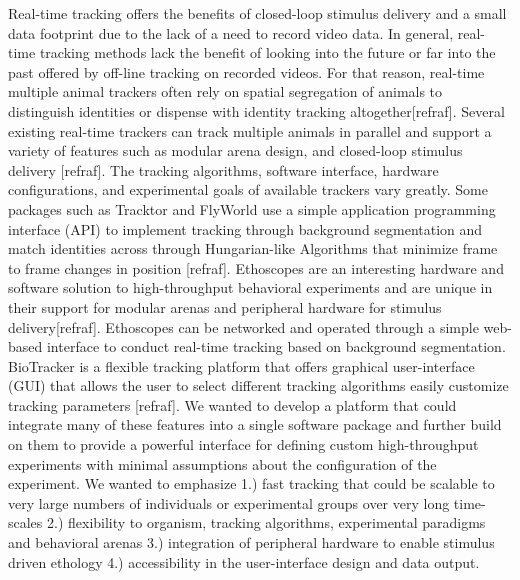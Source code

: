 \documentclass[10pt]{article}
\begin{document}
\begin{multicols}{2}
Real-time tracking offers the benefits of closed-loop stimulus delivery and a small data footprint due to the lack of a need to record video data. In general, real-time tracking methods lack the benefit of looking into the future or far into the past offered by off-line tracking on recorded videos. For that reason, real-time multiple animal trackers often rely on spatial segregation of animals to distinguish identities or dispense with identity tracking altogether[refraf]. Several existing real-time trackers can track multiple animals in parallel and support a variety of features such as modular arena design, and closed-loop stimulus delivery [refraf]. The tracking algorithms, software interface, hardware configurations, and experimental goals of available trackers vary greatly. Some packages such as Tracktor and FlyWorld use a simple application programming interface (API) to implement tracking through background segmentation and match identities across through Hungarian-like Algorithms that minimize frame to frame changes in position [refraf]. Ethoscopes are an interesting hardware and software solution to high-throughput behavioral experiments and are unique in their support for modular arenas and peripheral hardware for stimulus delivery[refraf]. Ethoscopes can be networked and operated through a simple web-based interface to conduct real-time tracking based on background segmentation. BioTracker is a flexible tracking platform that offers graphical user-interface (GUI) that allows the user to select different tracking algorithms easily customize tracking parameters [refraf]. We wanted to develop a platform that could integrate many of these features into a single software package and further build on them to provide a powerful interface for defining custom high-throughput experiments with minimal assumptions about the configuration of the experiment. We wanted to emphasize 1.) fast tracking that could be scalable to very large numbers of individuals or experimental groups over very long time-scales 2.) flexibility to organism, tracking algorithms, experimental paradigms and behavioral arenas 3.) integration of peripheral hardware to enable stimulus driven ethology 4.) accessibility in the user-interface design and data output. 


\end{multicols}
\end{document}
